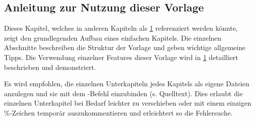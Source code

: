 %
\begin{showExamples}%
%
\chapter{Anleitung zur Nutzung dieser Vorlage}%
\label{chap:Examples}
%
%
Dieses Kapitel, welches in anderen Kapiteln als \cref{chap:Examples} referenziert werden könnte, zeigt den grundlegenden Aufbau eines einfachen Kapitels.
Die einzelnen Abschnitte beschreiben die Struktur der Vorlage und geben wichtige allgemeine Tipps.
Die Verwendung einzelner Features dieser Vorlage wird in \cref{chap:Examples} detailliert beschrieben und demonstriert.

Es wird empfohlen, die einzelnen Unterkapiteln jedes Kapitels als eigene Dateien anzulegen und sie mit dem \verb++-Befehl einzubinden (s. Quelltext).
Dies erlaubt die einzelnen Unterkapitel bei Bedarf leichter zu verschieben oder mit einem einzigen \%-Zeichen temporär auszukommentieren und erleichtert so die Fehlersuche.


\end{showExamples}
